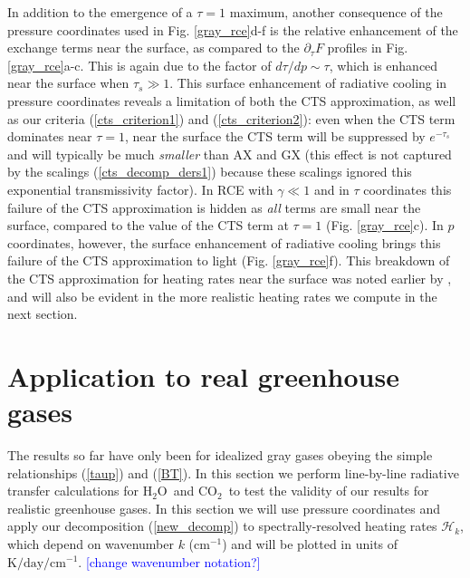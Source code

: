 \documentclass{ametsoc}
\newcommand{\eqnref}[1]{(\ref{#1})}
\newcommand{\comment}[1]{\textcolor{blue}{[{#1}]}}
\newcommand{\Kelvin}{\ensuremath{\mathrm{K}}}
\newcommand{\cminverse}{\ensuremath{\mathrm{cm^{-1}}}}
\newcommand{\pptau}{\ensuremath{\partial_\tau}}
\newcommand{\cotwo}{\ensuremath{\mathrm{CO_2}}}
\newcommand{\htwo}{\ensuremath{\mathrm{H_2O}}}
\newcommand{\ch}{\ensuremath{\mathcal{H}}}
\newcommand{\chk}{\ensuremath{\ch_k}}
\newcommand{\taus}{\ensuremath{\tau_s}}
\begin{document}
In addition to the emergence of a $\tau=1$ maximum, another consequence of the pressure coordinates used in  Fig. \ref{gray_rce}d-f is the relative enhancement of the exchange terms near the surface, as compared  to the $\pptau F$ profiles in Fig. \ref{gray_rce}a-c. This is again due to the factor of $d \tau/dp\sim \tau$, which is enhanced near the surface when $\taus \gg 1$. This surface enhancement of radiative cooling in pressure coordinates reveals a limitation of both the CTS approximation, as well as our criteria \eqnref{cts_criterion1} and \eqnref{cts_criterion2}: even when the CTS term dominates near $\tau= 1$, near the surface the CTS term will be suppressed by $e^{-\taus}$ and will typically be much \emph{smaller} than AX and GX (this effect is not captured by the scalings \eqnref{cts_decomp_ders1} because these scalings ignored this exponential transmissivity factor).  In RCE with $\gamma \ll 1$ and in $\tau$ coordinates this failure of the CTS approximation is hidden as \emph{all}  terms are small near the surface, compared to the value of the CTS term at $\tau=1$ (Fig. \ref{gray_rce}c). In $p$ coordinates, however, the surface enhancement of radiative cooling  brings this failure of the CTS approximation to light (Fig. \ref{gray_rce}f). This breakdown of the CTS approximation for heating rates near the surface was noted earlier by \cite{joseph1976}, and will also be evident in the more realistic heating rates we compute in the next section.

\section{Application to real greenhouse gases} \label{sec_rfm_calcs}
The results so far have only been for idealized gray gases obeying the simple relationships \eqnref{taup} and \eqnref{BT}. In this section we perform line-by-line radiative transfer calculations for \htwo\ and \cotwo\ to test the validity of our results for realistic greenhouse gases. In this section we will use pressure coordinates and apply our decomposition \eqnref{new_decomp} to spectrally-resolved heating rates \chk, which depend on wavenumber $k$ (\cminverse) and will be plotted in  units of $\Kelvin/\mathrm{day}/\cminverse$.
\comment{change wavenumber notation?}
\end{document}
